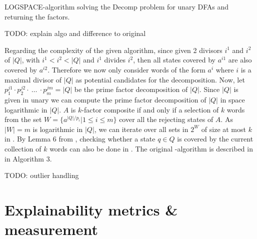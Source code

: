 \begin{algorithm}[H]
	\label{algo:composite}
	\DontPrintSemicolon

	
	
	\caption{LOGSPACE-algorithm solving the Decomp problem for unary DFAs and returning the factors.}
\end{algorithm}

TODO: explain algo and difference to original

Regarding the complexity of the given algorithm, since given 2 divisors $i^1$ and $i^2$ of $|Q|$, with $i^1 < i^2 <|Q|$ and $i^1$ divides $i^2$, then all states covered by $a^{i1}$ are also covered by $a^{i2}$. Therefore we now only consider words of the form $a^i$ where $i$ is a maximal divisor of $|Q|$ as potential candidates for the decomposition. Now, let $p_1^{j1} \cdot p_2^{j2} \cdot ~ \dots ~\cdot p_m^{jm} = |Q|$ be the prime factor decomposition of $|Q|$. Since $|Q|$ is given in unary we can compute the prime factor decomposition of $|Q|$ in space logarithmic in $|Q|$. $A$ is $k$-factor composite if and only if a selection of $k$ words from the set $W = \{a^{|Q|/p_i} | 1 \leq i \leq m\}$ cover all the rejecting states of $A$.  As $|W| = m$ is logarithmic in $|Q|$, we can iterate over all sets in $2^W$ of size at most $k$ in \LogSpace. By Lemma 6 from \cite{DBLP:journals/corr/abs-2107-04683}, checking whether a state $q \in Q$ is covered by the current collection of $k$ words can also be done in \LogSpace. The original \LogSpace-algorithm is described in \cite{DBLP:journals/corr/abs-2107-04683} in Algorithm 3.

TODO: outlier handling

\section{Explainability metrics \& measurement}


